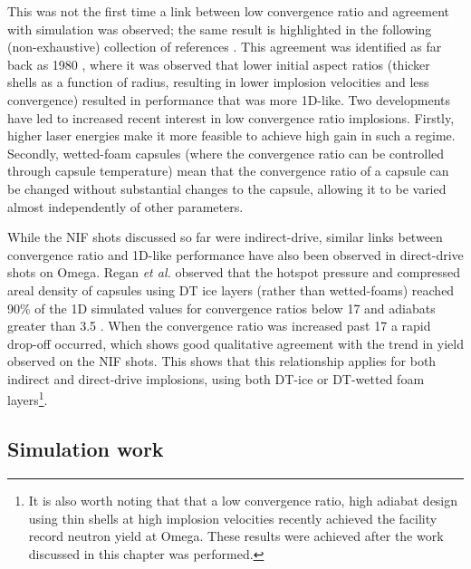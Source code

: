 This was not the first time a link between low convergence ratio and agreement with simulation was observed; the same result is highlighted in the following (non-exhaustive) collection of references \cite{Kato1996, Nishimura2000, Meyerhofer2001, Li2002, Lindl2004, LePape2014, Khan2016, Haines2017a}. This agreement was identified as far back as 1980 \cite{Key1980}, where it was observed that lower initial aspect ratios (thicker shells as a function of radius, resulting in lower implosion velocities and less convergence) resulted in performance that was more 1D-like. Two developments have led to increased recent interest in low convergence ratio implosions. Firstly, higher laser energies make it more feasible to achieve high gain in such a regime. Secondly, wetted-foam capsules (where the convergence ratio can be controlled through capsule temperature) mean that the convergence ratio of a capsule can be changed without substantial changes to the capsule, allowing it to be varied almost independently of other parameters.

While the NIF shots discussed so far were indirect-drive, similar links between convergence ratio and 1D-like performance have also been observed in direct-drive shots on Omega. Regan \textit{et al.} observed that the hotspot pressure and compressed areal density of capsules using DT ice layers (rather than wetted-foams) reached 90\% of the 1D simulated values for convergence ratios below 17 and adiabats greater than 3.5 \cite{Regan2016}. When the convergence ratio was increased past 17 a rapid drop-off occurred, which shows good qualitative agreement with the trend in yield observed on the NIF shots. This shows that this relationship applies for both indirect and direct-drive implosions, using both DT-ice or DT-wetted foam layers\footnote{It is also worth noting that that a low convergence ratio, high adiabat design using thin shells at high implosion velocities \cite{Williams2021} recently achieved the facility record neutron yield at Omega. These results were achieved after the work discussed in this chapter was performed.}.


\subsection{Simulation work} 

